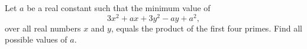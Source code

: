 Let $a$ be a real constant such that the minimum value of
\[3x^2+ax+3y^2-ay+a^2,\]
over all real numbers $x$ and $y$, equals the product of the first four primes. Find all possible values of $a$.
